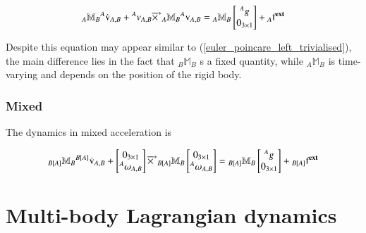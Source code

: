 \begin{equation} \label{euler_poincare_right_trivialised}
    {}_A\mathbb{M}_B {}^{A}{\dot{\text{v}}}_{A,B} + {}^{A}{v}_{A,B}\overline{\times}^{*} {}_A\mathbb{M}_B {}^{A}{\text{v}}_{A,B} = {}_A\mathbb{M}_B
    \begin{bmatrix}
        {}^{A}{g}_{}\\
        0_{3\times1}
    \end{bmatrix}
    + {}_A\text{f}^{\textbf{ext}}
\end{equation}

Despite this equation may appear similar to (\ref{euler_poincare_left_trivialised}), the main difference lies in the fact that ${}_B\mathbb{M}_B$ s a fixed quantity, while ${}_A\mathbb{M}_B$ is time-varying and depends on the position of the rigid body.

\subsubsection{Mixed}
The dynamics in mixed acceleration is

\begin{equation}\label{euler_poincare_mixed}
    {}_{B[A]}\mathbb{M}_B {}^{B[A]}{\dot{\text{v}}}_{A,B} + 
    \begin{bmatrix}
        0_{3\times 1}\\
        {}^{A}{\omega}_{A,B}
    \end{bmatrix}
    \overline{\times}^{*} {}_{B[A]}\mathbb{M}_B 
    \begin{bmatrix}
        0_{3\times1}\\
        {}^{A}{\omega}_{A,B}
    \end{bmatrix}
    = {}_{B[A]}\mathbb{M}_B
    \begin{bmatrix}
        {}^{A}{g}_{}\\
        0_{3\times1}
    \end{bmatrix}
    + {}_{B[A]}\text{f}^{\textbf{ext}}
\end{equation}


\section{Multi-body Lagrangian dynamics}
